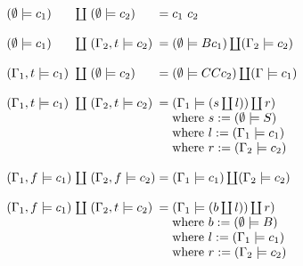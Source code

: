 \documentclass[conference]{IEEEtran}
\begin{document}
\begin{figure}
    \begin{equation*}
        \arraycolsep=1.4pt
        \begin{array}{l l l l l}
            (\emptyset \models c_1)  & \coprod & (\emptyset \models c_2)  & = & c_1 \ c_2                                                \\
            \\
            (\emptyset \models c_1)  & \coprod & (\Gamma_2,t \models c_2) & = & (\emptyset \models B c_1) \coprod (\Gamma_2 \models c_2) \\
            \\
            (\Gamma_1,t \models c_1) & \coprod & (\emptyset \models c_2)  & = & (\emptyset \models C C c_2) \coprod (\Gamma \models c_1) \\
            \\
            (\Gamma_1,t \models c_1) & \coprod & (\Gamma_2,t \models c_2) & = & (\Gamma_1 \models (s \coprod l)) \coprod r)              \\
                                     &         &                          &   & \text{where } s := (\emptyset \models S )                \\
                                     &         &                          &   & \text{where } l := (\Gamma_1 \models c_1 )               \\
                                     &         &                          &   & \text{where } r := (\Gamma_2 \models c_2 )               \\
            \\
            (\Gamma_1,f \models c_1) & \coprod & (\Gamma_2,f \models c_2) & = & (\Gamma_1 \models c_1) \coprod (\Gamma_2 \models c_2)    \\
            \\
            (\Gamma_1,f \models c_1) & \coprod & (\Gamma_2,t \models c_2) & = & (\Gamma_1 \models (b \coprod l)) \coprod r)              \\
                                     &         &                          &   & \text{where } b := (\emptyset \models B )                \\
                                     &         &                          &   & \text{where } l := (\Gamma_1 \models c_1 )               \\
                                     &         &                          &   & \text{where } r := (\Gamma_2 \models c_2 )               \\

\end{array}
\end{equation*}
\end{figure}
\end{document}

